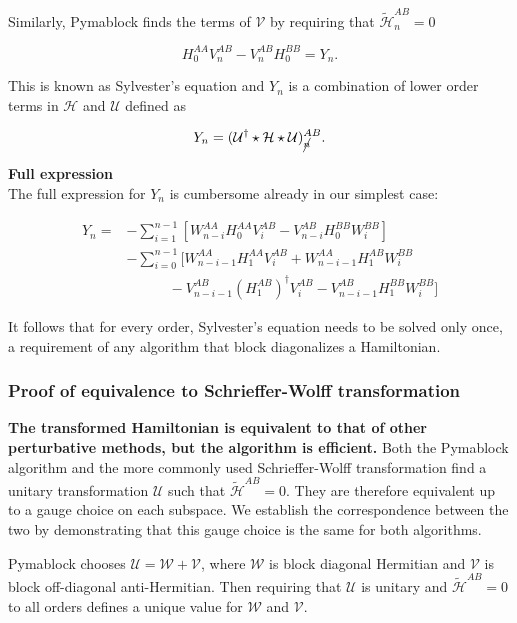 Similarly, Pymablock finds the terms of $\mathcal{V}$ by requiring that
$\tilde{\mathcal{H}}^{AB}_n=0$

\begin{equation}
\label{sylvester}
H_0^{AA} V_{n}^{AB} - V_{n}^{AB} H_0^{BB} = Y_{n}.
\end{equation}

This is known as Sylvester's equation and $Y_{n}$ is a combination of lower
order terms in $\mathcal{H}$ and $\mathcal{U}$ defined as

\begin{equation}
Y_n = (\mathcal{U}^\dagger \star \mathcal{H} \star \mathcal{U})_{\cancel{n}}^{AB}.
\end{equation}

\begin{framed}
\textbf{Full expression}\\
The full expression for $Y_n$ is cumbersome already in our simplest case:

\begin{align}
\label{y_n}
Y_n=&-
\sum_{i=1}^{n-1}\left[W_{n-i}^{AA}H_0^{AA}V_i^{AB}-V_{n-i}^{AB}
H_0^{BB}W_i^{BB}\right] \\
&-\sum_{i=0}^{n-1}\bigg[W_{n-i-1}^{AA}H_1^{AA}V_i^{AB}+W_{n-i-1}^{AA}
H_1^{AB}W_i^{BB} \\
&\quad \quad \quad -V_{n-i-1}^{AB}(H_1^{AB})^\dagger V_i^{AB} -V_{n-i-1}^{AB}
H_1^{BB}W_i^{BB}\bigg]
\end{align}
\end{framed}

It follows that for every order, Sylvester's equation needs to be solved
only once, a requirement of any algorithm that block diagonalizes a Hamiltonian.

\subsubsection{Proof of equivalence to Schrieffer-Wolff transformation}

\textbf{The transformed Hamiltonian is equivalent to that of other perturbative
methods, but the algorithm is efficient.}
Both the Pymablock algorithm and the more commonly used Schrieffer-Wolff
transformation find a unitary transformation $\mathcal{U}$ such that
$\tilde{\mathcal{H}}^{AB}=0$.
They are therefore equivalent up to a gauge choice on each subspace.
We establish the correspondence between the two by demonstrating that this gauge
choice is the same for both algorithms.

Pymablock chooses $\mathcal{U}=\mathcal{W}+\mathcal{V}$, where $\mathcal{W}$ is
block diagonal Hermitian and $\mathcal{V}$ is block off-diagonal
anti-Hermitian.
Then requiring that $\mathcal{U}$ is unitary and $\tilde{\mathcal{H}}^{AB}=0$
to all orders defines a unique value for $\mathcal{W}$ and $\mathcal{V}$.

